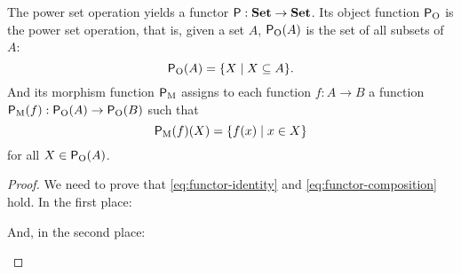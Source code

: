 \begin{example}
  \label{ex:functor-power-set}


  The power set operation yields a functor $\mathsf{P}: \mathbf{Set} \to \mathbf{Set}$.
  Its object function $\mathsf{P}_{\operatorname{O}}$ is the power set operation, that is,
  given a set $A$, $\mathsf{P}_{\operatorname{O}}(A)$ is the set of all subsets of $A$:
  \begin{equation}
    \label{eq:functor-power-set-object}
    \mathsf{P}_{\operatorname{O}}(A) = \{X \mid X \subseteq A\}
    \text{.}
  \end{equation}
  And its morphism function $\mathsf{P}_{\operatorname{M}}$ assigns to each function $f: A
  \to B$ a function $\mathsf{P}_{\operatorname{M}}(f): \mathsf{P}_{\operatorname{O}}(A) \to \mathsf{P}_{\operatorname{O}}(B)$ such
  that
  \begin{equation}
    \label{eq:functor-power-set-morphism}
    \mathsf{P}_{\operatorname{M}}(f)(X) = \{f(x) \mid x \in X\}
  \end{equation}
  for all $X \in \mathsf{P}_{\operatorname{O}}(A)$.

  \begin{proof}

    We need to prove that \eqref{eq:functor-identity} and
    \eqref{eq:functor-composition} hold. In the first place:
    \begin{steps}
        \eqby{\eqref{eq:set-identity}}
        \eqbynothing
    \end{steps}
    And, in the second place:
    \begin{steps}
        \eqby{\eqref{eq:set-composition}}
        \eqby{\eqref{eq:functor-power-set-morphism}}
    \end{steps}

  \end{proof}

\end{example}

